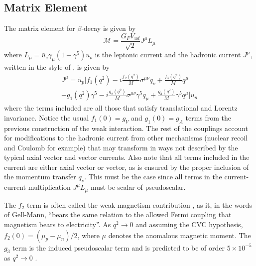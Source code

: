 \subsection{Matrix Element}
The matrix element for $\beta$-decay is given by
%
\begin{equation}
  \mathcal{M} = \frac{G_FV_{ud}}{\sqrt{2}} J^\mu L_\mu
\end{equation}
%
where $L_\mu = \bar{u}_e \gamma_\mu (1-\gamma^5) u_{\bar{\nu}}$ is the leptonic current
and the hadronic current $J^\mu$, written in the style of \cite{gardner2001}, is given by
%
\begin{multline}
  J^\mu = \bar{u}_p \bigg[ f_1(q^2) - i \frac{f_{2}(q^2)}{M}\sigma^{\mu\nu}q_\nu + \frac{f_3(q^2)}{M}q^\mu \\
    + g_1(q^2)\gamma^5 - i \frac{g_{2}(q^2)}{M}\sigma^{\mu\nu}\gamma^5q_\mu 
    +  \frac{g_3(q^2)}{M}\gamma^5q^\mu \bigg] u_n
\end{multline}
%
where the terms included are all those that satisfy translational and Lorentz invariance. Notice the
usual $f_1(0)=g_V$ and $g_1(0) = g_A$ terms from the previous construction of the weak interaction. The
rest of the couplings
account for modifications to the hadronic current from other mechanisms (nuclear recoil and Coulomb for example)
that may transform in ways not described by the typical axial vector and vector currents. Also note that all terms
included in the current are either axial vector or vector, as is ensured by the proper inclusion of the momentum
transfer $q_\nu$. This must be the case since all terms in the current-current multiplication $J^\mu L_\mu$ must be
scalar of pseudoscalar.

The $f_2$ term is often called the weak magnetism contribution \cite{gellmann1958}, as it, in
the words of Gell-Mann,
``bears the same relation to the allowed Fermi coupling that magnetism bears to electricity''.
As $q^2\rightarrow0$ and assuming the CVC hypothesis,
$f_2(0) = (\mu_p - \mu_n)/2$, where $\mu$ denotes the anomalous magnetic moment.
The $g_3$ term is the induced pseudoscalar term and is predicted to be of order $5\times 10^{-5}$ as
$q^2\rightarrow0$ \cite{holstein1974recoil}.

